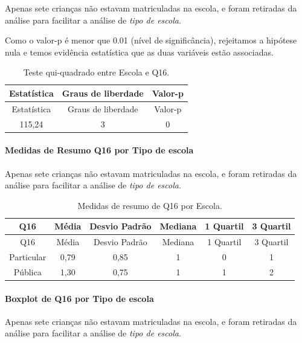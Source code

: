 \documentclass[]{article}
\let\oldparagraph\paragraph
\renewcommand{\paragraph}[1]{\oldparagraph{#1}\mbox{}}
\begin{document}
Apenas sete crianças não estavam matriculadas na escola, e foram retiradas da análise para facilitar a análise de \emph{tipo de escola}.

Como o valor-p é menor que 0.01 (nível de significância), rejeitamos a hipótese nula e temos evidência estatística que as duas variáveis estão associadas.

\begin{longtable}[]{@{}ccc@{}}
\caption{\label{tab:unnamed-chunk-174}Teste qui-quadrado entre Escola e Q16.}\tabularnewline
\toprule
Estatística & Graus de liberdade & Valor-p\tabularnewline
\midrule
\endfirsthead
\toprule
Estatística & Graus de liberdade & Valor-p\tabularnewline
\midrule
\endhead
115,24 & 3 & 0\tabularnewline
\bottomrule
\end{longtable}

\cleardoublepage

\hypertarget{medidas-de-resumo-q16-por-tipo-de-escola}{%
\paragraph{Medidas de Resumo Q16 por Tipo de escola}\label{medidas-de-resumo-q16-por-tipo-de-escola}}

Apenas sete crianças não estavam matriculadas na escola, e foram retiradas da análise para facilitar a análise de \emph{tipo de escola}.

\begin{longtable}[]{@{}cccccc@{}}
\caption{\label{tab:unnamed-chunk-175}Medidas de resumo de Q16 por Escola.}\tabularnewline
\toprule
Q16 & Média & Desvio Padrão & Mediana & 1 Quartil & 3 Quartil\tabularnewline
\midrule
\endfirsthead
\toprule
Q16 & Média & Desvio Padrão & Mediana & 1 Quartil & 3 Quartil\tabularnewline
\midrule
\endhead
Particular & 0,79 & 0,85 & 1 & 0 & 1\tabularnewline
Pública & 1,30 & 0,75 & 1 & 1 & 2\tabularnewline
\bottomrule
\end{longtable}

\hypertarget{boxplot-de-q16-por-tipo-de-escola}{%
\paragraph{Boxplot de Q16 por Tipo de escola}\label{boxplot-de-q16-por-tipo-de-escola}}

Apenas sete crianças não estavam matriculadas na escola, e foram retiradas da análise para facilitar a análise de \emph{tipo de escola}.
\end{document}
